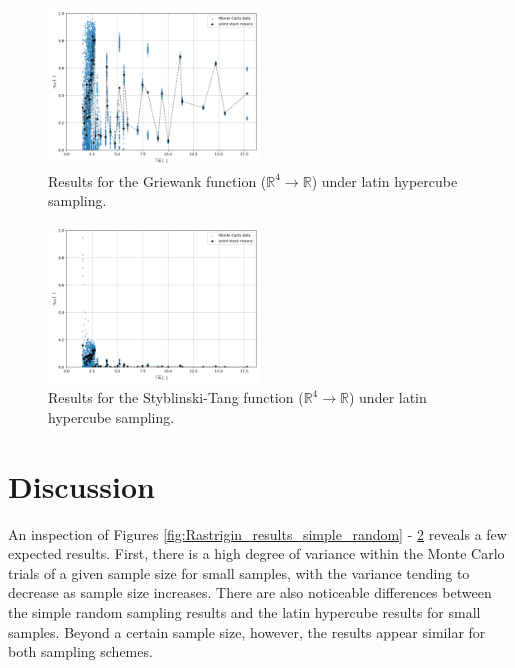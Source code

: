 \documentclass[conference]{IEEEtran}
\begin{document}
\begin{figure}[htbp]
	\centerline{\includegraphics[width=0.5\textwidth]{results/griewank/results_sampling_latin_hypercube_dimensionality_4.png}}
	\caption{Results for the Griewank function ($\mathbb{R}^4\to\mathbb{R}$) under latin hypercube sampling.}
	\label{fig:Griewank_results_latin_hypercube}
\end{figure}

\begin{figure}[htbp]
	\centerline{\includegraphics[width=0.5\textwidth]{results/styblinskitang/results_sampling_latin_hypercube_dimensionality_4.png}}
	\caption{Results for the Styblinski-Tang function ($\mathbb{R}^4\to\mathbb{R}$) under latin hypercube sampling.}
	\label{fig:Styblinski-Tang_results_latin_hypercube}
\end{figure}

\section{Discussion}

An inspection of Figures \ref{fig:Rastrigin_results_simple_random} - \ref{fig:Styblinski-Tang_results_latin_hypercube} reveals a few expected results. First, there is a high degree of variance within the Monte Carlo trials of a given sample size for small samples, with the variance tending to decrease as sample size increases. There are also noticeable differences between the simple random sampling results and the latin hypercube results for small samples. Beyond a certain sample size, however, the results appear similar for both sampling schemes.
\end{document}
